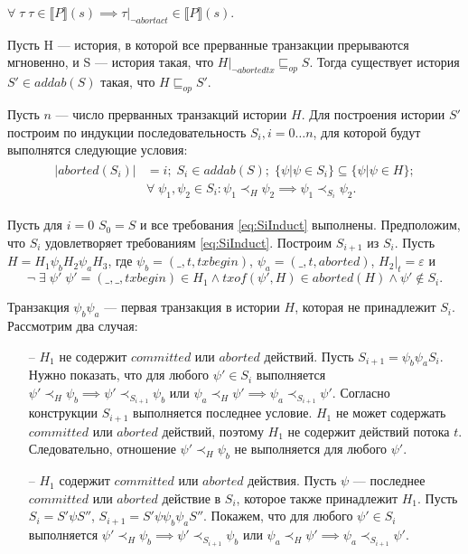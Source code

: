 \begin{mystatement}\label{statement1}
$\forall \; \tau \; \tau \in \llbracket P \rrbracket (s) \implies \tau|_{\neg abortact} \in \llbracket P \rrbracket (s).$
\end{mystatement}
\begin{lemma}\label{sufficiency4}
Пусть H --- история, в которой все прерванные транзакции прерываются мгновенно, и S --- история такая, что $H|_{\neg abortedtx} \sqsubseteq_{op} S$. Тогда существует история $S' \in addab(S)$ такая, что $H \sqsubseteq_{op} S'$. 
\end{lemma}
\begin{myproof}
Пусть $n$ --- число прерванных транзакций истории $H$. Для построения истории $S'$ построим по индукции последовательность $S_i, i = 0 \ldots n$, для которой будут выполнятся следующие условия:
\begin{align}\label{eq:SiInduct}
\begin{split}
|aborted(S_i)| &= i; \; S_i \in addab(S); \; \{\psi| \psi \in S_i\} \subseteq \{\psi | \psi \in H \}; \\ &\forall \; \psi_1, \psi_2 \in S_i: \psi_1 \prec_H \psi_2 \implies \psi_1 \prec_{S_i} \psi_2.
\end{split}
\end{align}

Пусть для $i = 0$ $S_0 = S$ и все требования \eqref{eq:SiInduct} выполнены. Предположим, что $S_i$ удовлетворяет требованиям \eqref{eq:SiInduct}. Построим $S_{i+1}$ из $S_i$. Пусть $H = H_1\psi_{b}H_2\psi_{a}H_3$, где $\psi_b = (\_, t, txbegin)$, $\psi_a = (\_,t, aborted)$, $H_2|_t = \varepsilon$ и $$\neg \; \exists \; \psi' \; \psi' = (\_, \_, txbegin) \in H_1 \land txof(\psi', H) \in aborted(H) \land \psi' \notin S_i.$$

Транзакция $\psi_b\psi_a$ --- первая транзакция в истории $H$, которая не принадлежит $S_i$. Рассмотрим два случая:
\begin{itemize}
\item[--] $H_1$ не содержит $committed$ или $aborted$ действий. Пусть $S_{i+1} = \psi_b\psi_{a}S_i$. Нужно показать, что для любого $\psi' \in S_i$ выполняется $\psi' \prec_H \psi_b \implies \psi' \prec_{S_{i+1}} \psi_b$ или $\psi_a \prec_H \psi' \implies \psi_a \prec_{S_{i+1}} \psi'$. Согласно конструкции $S_{i+1}$ выполняется последнее условие. $H_1$ не может содержать $committed$ или $aborted$ действий, поэтому $H_1$ не содержит действий потока $t$. Следовательно, отношение $\psi' \prec_H \psi_b$ не выполняется для любого $\psi'$. 
\item[--] $H_1$ содержит $committed$ или $aborted$ действия. Пусть $\psi$ --- последнее $committed$ или $aborted$ действие в $S_i$, которое также принадлежит $H_1$. Пусть $S_{i} = S'\psi{S''}$, $S_{i+1} = S'\psi\psi_b\psi_a{S''}$. Покажем, что для любого $\psi' \in S_i$ выполняется $\psi' \prec_H \psi_b \implies \psi' \prec_{S_{i+1}} \psi_b$ или $\psi_a \prec_H \psi' \implies \psi_a \prec_{S_{i+1}} \psi'$.


\end{itemize}
\end{myproof}
